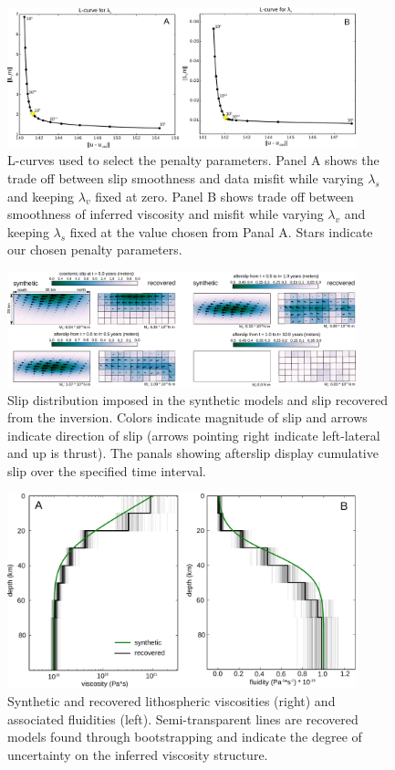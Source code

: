 \documentclass[extra,mreferee]{gji}
\begin{document}
\begin{figure}[h!]\label{figure2}
  \centering
  \includegraphics[width=0.9\textwidth]{FinalFigures/Figure6.pdf}
  \caption{L-curves used to select the penalty parameters. Panel A
    shows the trade off between slip smoothness and data misfit while
    varying $\lambda_s$ and keeping $\lambda_v$ fixed at zero.  Panel
    B shows trade off between smoothness of inferred viscosity and
    misfit while varying $\lambda_v$ and keeping $\lambda_s$ fixed at
    the value chosen from Panal A.  Stars indicate our chosen penalty
    parameters.}
  \label{Figure 2}
\end{figure}

\begin{figure}[h!]\label{figure3}
  \centering
  \includegraphics[width=0.9\textwidth]{FinalFigures/Figure2.pdf}
  \caption{Slip distribution imposed in the synthetic models and slip
    recovered from the inversion. Colors indicate magnitude of slip
    and arrows indicate direction of slip (arrows pointing right
    indicate left-lateral and up is thrust).  The panals showing
    afterslip display cumulative slip over the specified time
    interval.}
  \label{Figure 3}
\end{figure}

\begin{figure}[h!]\label{figure4}
  \centering
  \includegraphics[width=0.9\textwidth]{FinalFigures/Figure3.pdf}
  \caption{Synthetic and recovered lithospheric viscosities (right)
    and associated fluidities (left).  Semi-transparent lines are recovered
    models found through bootstrapping and indicate the degree of
    uncertainty on the inferred viscosity structure.}
  \label{Figure 4}
\end{figure}
\end{document}
